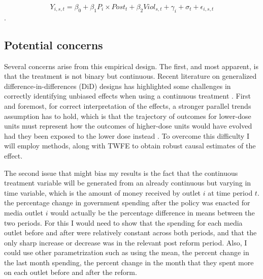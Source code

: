 $$Y_{i, s, t} = \beta_0 + \beta_1 P_{i}\times Post_{t} + \beta_2 Viol_{s, t} + \gamma_i + \sigma_t + \epsilon_{i, s, t} $$.

\subsection{Potential concerns}

Several concerns arise from this empirical design. The first, and most apparent, is that the treatment is not binary but continuous. Recent literature on generalized difference-in-differences (DiD) designs has highlighted some challenges in correctly identifying unbiased effects when using a continuous treatment \citep{EventCont-Sant-AEA, Cont-Chaise-AEA, Cont-Sant-arxiv}. First and foremost, for correct interpretation of the effects, a stronger parallel trends assumption has to hold, which is that the trajectory of outcomes for lower-dose units must represent how the outcomes of higher-dose units would have evolved had they been exposed to the lower dose instead \citep{Cont-Sant-arxiv}. To overcome this difficulty I will employ \cite{Cont-Chaise-AEA, EventCont-Sant-AEA} methods, along with TWFE to obtain robust causal estimates of the effect. 

The second issue that might bias my results is the fact that the continuous treatment variable will be generated from an already continuous but varying in time variable, which is the amount of money received by outlet $i$ at time period $t$. the percentage change in government spending after the policy was enacted for media outlet $i$ would actually be the percentage difference in means between the two periods. For this I would need to show that the spending for each media outlet before and after were relatively constant across both periods, and that the only sharp increase or decrease was in the relevant post reform period. Also, I could use other parametrization such as using the mean, the percent change in the last month spending, the percent change in the month that they spent more on each outlet before and after the reform. 